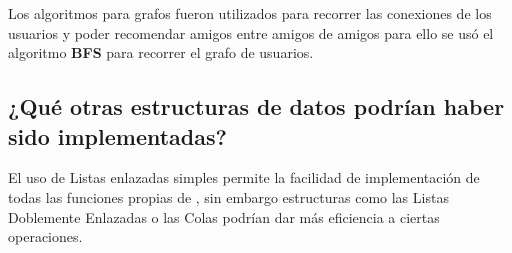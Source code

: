 Los algoritmos para grafos fueron utilizados para recorrer las conexiones de los usuarios y poder recomendar amigos entre amigos de amigos para ello se usó el algoritmo \textbf{BFS} para recorrer el grafo de usuarios.

\subsection*{¿Qué otras estructuras de datos podrían haber sido implementadas?}
El uso de Listas enlazadas simples permite la facilidad de implementación de todas las funciones propias de \loopweb, sin embargo estructuras como las Listas Doblemente Enlazadas o las Colas podrían dar más eficiencia a ciertas operaciones.
